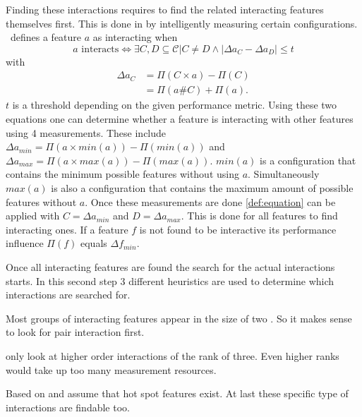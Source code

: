 Finding these interactions requires to find the related interacting features themselves first.
This is done in by intelligently measuring certain configurations. \AFID~defines a feature $a$ as interacting when
\begin{equation}\label{def:equation}
a \text{ interacts} \Leftrightarrow \exists C,D \subseteq \mathcal{C}| C \neq D  \land	 |\Delta a_C - \Delta a_D| \leq t
\end{equation}
with 
\begin{equation}
\begin{split}
\Delta a_C &= \Pi(C\times a) - \Pi(C)\\
&=\Pi(a\# C) + \Pi(a).
\end{split}
\end{equation}
$t$ is a threshold depending on the given performance metric.
Using these two equations one can determine whether a feature is interacting with other features using 4 measurements.
These include $\Delta a_{min} = \Pi(a \times min(a)) - \Pi(min(a))$ and $\Delta a_{max} = \Pi(a \times max(a)) - \Pi(max(a))$. $min(a)$ is a configuration that contains the minimum possible features without using $a$. Simultaneously $max(a)$ is also a configuration that contains the maximum amount of possible features without $a$. 
Once these measurements are done \cref{def:equation} can be applied with $C=\Delta a_{min}$ and $D=\Delta a_{max}$. This is done for all features to find interacting ones.
If a feature $f$ is not found to be interactive its performance influence $\Pi(f)$ equals $\Delta f_{min}$.

Once all interacting features are found the search for the actual interactions starts. In this second step 3 different heuristics are used to determine which interactions are searched for.
 
 \newcommand{\oitem}[2]{{\item[{\parbox[t][0pt][t]{\leftmargin}{\raggedleft #1}}] {\parbox[t]{\textwidth-\leftmargin}{#2}}}}
 \begin{itemize}[leftmargin=4cm]
 	\setlength\itemsep{1em}
 	\oitem{Pair-Wise~Heuristic (PW):\label{lab:PW}}{ Most groups of interacting features appear in the size of two \cite{AutomatedFeatureDetectionSiegmund2012,AnalysisOfTheVariabilityInFortyPreprocessor_BasedSPLLiebig}. So it makes sense to look for pair interaction first.}
 	\oitem{Higher-Order Interactions Heuristic (HO):\label{lab:HO}}{
 		\citet{AutomatedFeatureDetectionSiegmund2012} only look at higher order interactions of the rank of three. Even higher ranks would take up too many measurement resources.
 	}
 	\oitem{Hot-Spot Features Heuristic(HS):\label{lab:HS}}{
 		Based on \cite{FeatureCohesioninSPL} and \cite{CanWeAvoidHighCoupling?} \citet{AutomatedFeatureDetectionSiegmund2012} assume that hot spot features exist. At last these specific type of interactions are findable too.
 	}
 \end{itemize}

